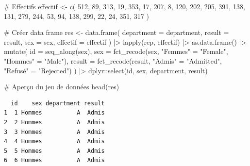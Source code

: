 \documentclass[
  letterpaper,
]{book}
\newenvironment{Shaded}{\begin{snugshade}}{\end{snugshade}}
\newcommand{\AttributeTok}[1]{\textcolor[rgb]{0.40,0.45,0.13}{#1}}
\newcommand{\CommentTok}[1]{\textcolor[rgb]{0.37,0.37,0.37}{#1}}
\newcommand{\DecValTok}[1]{\textcolor[rgb]{0.68,0.00,0.00}{#1}}
\newcommand{\FunctionTok}[1]{\textcolor[rgb]{0.28,0.35,0.67}{#1}}
\newcommand{\NormalTok}[1]{\textcolor[rgb]{0.00,0.23,0.31}{#1}}
\newcommand{\OtherTok}[1]{\textcolor[rgb]{0.00,0.23,0.31}{#1}}
\newcommand{\SpecialCharTok}[1]{\textcolor[rgb]{0.37,0.37,0.37}{#1}}
\newcommand{\StringTok}[1]{\textcolor[rgb]{0.13,0.47,0.30}{#1}}
\begin{document}
\begin{Shaded}
\begin{Highlighting}[]
\CommentTok{\# Effectifs}
\NormalTok{effectif }\OtherTok{\textless{}{-}} \FunctionTok{c}\NormalTok{(}
  \DecValTok{512}\NormalTok{,}
  \DecValTok{89}\NormalTok{,}
  \DecValTok{313}\NormalTok{,}
  \DecValTok{19}\NormalTok{,}
  \DecValTok{353}\NormalTok{,}
  \DecValTok{17}\NormalTok{,}
  \DecValTok{207}\NormalTok{,}
  \DecValTok{8}\NormalTok{,}
  \DecValTok{120}\NormalTok{,}
  \DecValTok{202}\NormalTok{,}
  \DecValTok{205}\NormalTok{,}
  \DecValTok{391}\NormalTok{,}
  \DecValTok{138}\NormalTok{,}
  \DecValTok{131}\NormalTok{,}
  \DecValTok{279}\NormalTok{,}
  \DecValTok{244}\NormalTok{,}
  \DecValTok{53}\NormalTok{,}
  \DecValTok{94}\NormalTok{,}
  \DecValTok{138}\NormalTok{,}
  \DecValTok{299}\NormalTok{,}
  \DecValTok{22}\NormalTok{,}
  \DecValTok{24}\NormalTok{,}
  \DecValTok{351}\NormalTok{,}
  \DecValTok{317}
\NormalTok{)}

\CommentTok{\# Créer data frame}
\NormalTok{res }\OtherTok{\textless{}{-}}
  \FunctionTok{data.frame}\NormalTok{(}
    \AttributeTok{department =}\NormalTok{ department,}
    \AttributeTok{result =}\NormalTok{ result,}
    \AttributeTok{sex =}\NormalTok{ sex,}
    \AttributeTok{effectif =}\NormalTok{ effectif}
\NormalTok{  ) }\SpecialCharTok{|\textgreater{}} 
  \FunctionTok{lapply}\NormalTok{(rep, effectif) }\SpecialCharTok{|\textgreater{}} 
  \FunctionTok{as.data.frame}\NormalTok{() }\SpecialCharTok{|\textgreater{}} 
  \FunctionTok{mutate}\NormalTok{(}
    \AttributeTok{id =} \FunctionTok{seq\_along}\NormalTok{(sex),}
    \AttributeTok{sex =} \FunctionTok{fct\_recode}\NormalTok{(sex, }\StringTok{"Femmes"} \OtherTok{=} \StringTok{"Female"}\NormalTok{, }\StringTok{"Hommes"} \OtherTok{=} \StringTok{"Male"}\NormalTok{),}
    \AttributeTok{result =} \FunctionTok{fct\_recode}\NormalTok{(result, }\StringTok{"Admis"} \OtherTok{=} \StringTok{"Admitted"}\NormalTok{, }\StringTok{"Refusé"} \OtherTok{=} \StringTok{"Rejected"}\NormalTok{)}
\NormalTok{    ) }\SpecialCharTok{|\textgreater{}} 
\NormalTok{  dplyr}\SpecialCharTok{::}\FunctionTok{select}\NormalTok{(id, sex, department, result)}

\CommentTok{\# Aperçu du jeu de données}
\FunctionTok{head}\NormalTok{(res)}
\end{Highlighting}
\end{Shaded}

\begin{verbatim}
  id    sex department result
1  1 Hommes          A  Admis
2  2 Hommes          A  Admis
3  3 Hommes          A  Admis
4  4 Hommes          A  Admis
5  5 Hommes          A  Admis
6  6 Hommes          A  Admis
\end{verbatim}
\end{document}
